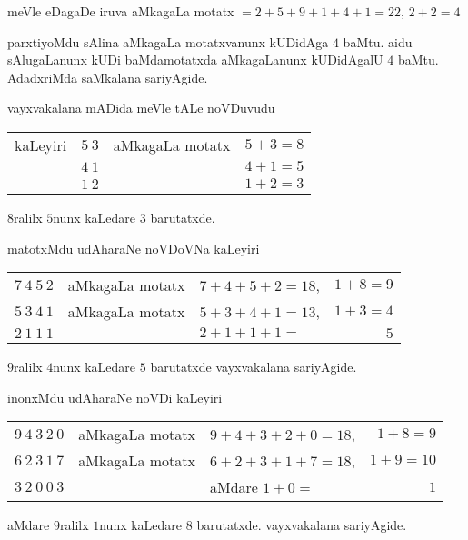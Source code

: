 \smallskip

\smallskip

meVle eDagaDe iruva aMkagaLa motatx $=2+5+9+1+4+1=22$, $2+2=4$

parxtiyoMdu sAlina aMkagaLa motatxvanunx kUDidAga $4$ baMtu. aidu sAlugaLanunx kUDi baMdamotatxda aMkagaLanunx kUDidAgalU $4$ baMtu. AdadxriMda saMkalana sariyAgide.

vayxvakalana mADida meVle tALe noVDuvudu

\smallskip

\begin{tabular}{lcll}
kaLeyiri & $5~3$ & aMkagaLa motatx & $5+3=8$\\
& $4~1$ & & $4+1=5$\\\cline{2-2}\cline{4-4}
& $1~2$ & & $1+2 =3$
\end{tabular}

\smallskip

$8$ralilx $5$nunx kaLedare $3$ barutatxde. 

matotxMdu udAharaNe noVDoVNa kaLeyiri

\smallskip

\begin{tabular}{lclr}
$7~4~5~2$ & aMkagaLa motatx & $7+4+5+2=18$, & $1+8=9$ \\
$5~3~4~1$ & aMkagaLa motatx & $5+3+4+1=13$, & $1+3=4$\\\cline{1-1}\cline{3-3}\cline{4-4}
$2~1~1~1$ & & $2+1+1+1 =$  & $5$
\end{tabular}

\smallskip

$9$ralilx $4$nunx kaLedare $5$ barutatxde vayxvakalana sariyAgide.

inonxMdu udAharaNe noVDi kaLeyiri

\smallskip

\begin{tabular}{lclr}
$9~4~3~2~0$ & aMkagaLa motatx & $9+4+3+2+0=18$, & $1+8=9$\\
$6~2~3~1~7$ & aMkagaLa motatx & $6+2+3+1+7=18$, & $1+9=10$\\\cline{1-1}\cline{3-4}
$3~2~0~0~3$ & & aMdare $1+0 =$ & $1$
\end{tabular}

\smallskip

aMdare $9$ralilx $1$nunx kaLedare $8$ barutatxde. vayxvakalana sariyAgide.
